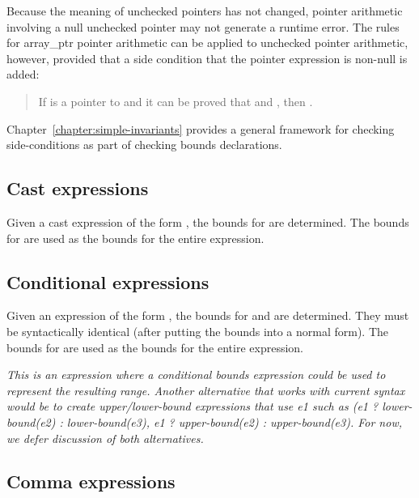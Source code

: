 Because the meaning of unchecked pointers has not changed, pointer
arithmetic involving a null unchecked pointer may not generate a runtime
error. The rules for array\_ptr pointer arithmetic can be applied to
unchecked pointer arithmetic, however, provided that a side condition that
the pointer expression is non-null is added:

\begin{quote}
If  is a pointer to  and it can be proved that
  and 
, then
.
\end{quote}

Chapter~\ref{chapter:simple-invariants}
provides a general framework for checking side-conditions as
part of checking bounds declarations.

\subsection{Cast expressions}
\label{section:cast-expressions}

Given a cast expression of the form ,
the bounds for  are determined. The bounds for
 are used as the bounds for the entire expression.
  
\subsection{Conditional expressions}

Given an expression of the form   
\code{:} , the bounds for  and  are
determined. They must be syntactically identical (after putting the
bounds into a normal form). The bounds for  are used as the
bounds for the entire expression.

\emph{This is an expression where a conditional bounds expression could
be used to represent the resulting range.  Another alternative that works
with current syntax would be to create upper/lower-bound expressions
that use e1 such as (e1 ? lower-bound(e2) : lower-bound(e3), e1 ?
upper-bound(e2) : upper-bound(e3). For now, we defer discussion of both
alternatives. }

\subsection{Comma expressions}

